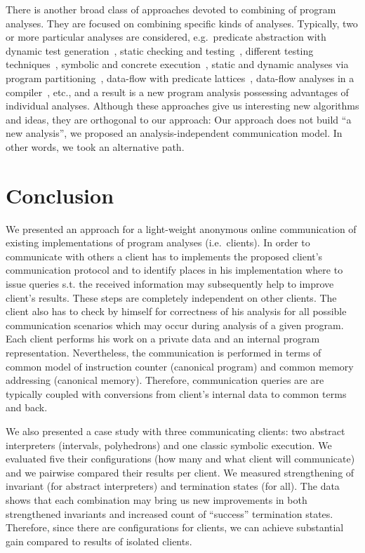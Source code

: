 \documentclass[envcountsame]{llncs}
\begin{document}
There is another broad class of approaches devoted to combining of program
analyses. They are focused on combining specific kinds of analyses. Typically,
two or more particular analyses are considered, e.g.~predicate abstraction with
dynamic test generation~\cite{SMASH}, static checking and
testing~\cite{CheckNCrash,StaticDynamic}, different testing
techniques~\cite{CombiningTesting}, symbolic and concrete
execution~\cite{Concolic}, static and dynamic analyses via program
partitioning~\cite{ProgramPartitioning}, data-flow with predicate
lattices~\cite{DataflowPredicates}, data-flow analyses in a
compiler~\cite{CombiningOptimisations,CompilerTranformations}, etc., and a
result is a new program analysis possessing advantages of individual analyses.
Although these approaches give us interesting new algorithms and ideas, they are
orthogonal to our approach: Our approach does not build ``a new analysis'', we
proposed an analysis-independent communication model. In other words, we took an
alternative path.



\section{Conclusion}
\label{sec:Conclusion}

We presented an approach for a light-weight anonymous online communication of
existing implementations of program analyses (i.e.~clients). In order to
communicate with others a client has to implements the proposed client's
communication protocol and to identify places in his implementation where to
issue queries s.t. the received information may subsequently help to improve
client's results. These steps are completely independent on other clients. The
client also has to check by himself for correctness of his analysis for all
possible communication scenarios which may occur during analysis of a given
program. Each client performs his work on a private data and an internal program
representation. Nevertheless, the communication is performed in terms of common
model of instruction counter (canonical program) and common memory addressing
(canonical memory). Therefore, communication queries are are typically coupled
with conversions from client's internal data to common terms and back.

We also presented a case study with three communicating clients: two abstract
interpreters (intervals, polyhedrons) and one classic symbolic execution. We
evaluated five their configurations (how many and what client will communicate)
and we pairwise compared their results per client. We measured strengthening of
invariant (for abstract interpreters) and termination states (for all). The data
shows that each combination may bring us new improvements in both strengthened
invariants and increased count of ``success'' termination states. Therefore,
since there are  configurations for  clients, we can achieve
substantial gain compared to results of  isolated clients.
\end{document}
